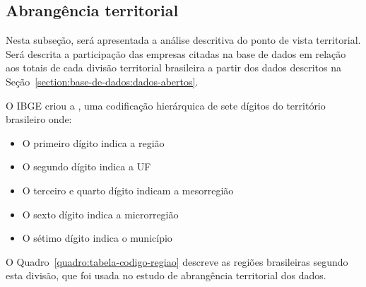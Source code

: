 \subsection{Abrangência territorial}
\label{section:base-de-dados:analise-descritiva:abrangencia-territorial}

Nesta subseção, será apresentada a análise descritiva do ponto de vista territorial. Será descrita a participação das empresas citadas na base de dados em relação aos totais de cada divisão territorial brasileira a partir dos dados descritos na Seção~\ref{section:base-de-dados:dados-abertos}.

O IBGE criou a , uma codificação hierárquica de sete dígitos do território brasileiro onde:

\begin{itemize}
    \item O primeiro dígito indica a região
    \item O segundo dígito indica a UF
    \item O terceiro e quarto dígito indicam a mesorregião
    \item O sexto dígito indica a microrregião
    \item O sétimo dígito indica o município
\end{itemize}

O Quadro~\ref{quadro:tabela-codigo-regiao} descreve as regiões brasileiras segundo esta divisão, que foi usada no estudo de abrangência territorial dos dados.

